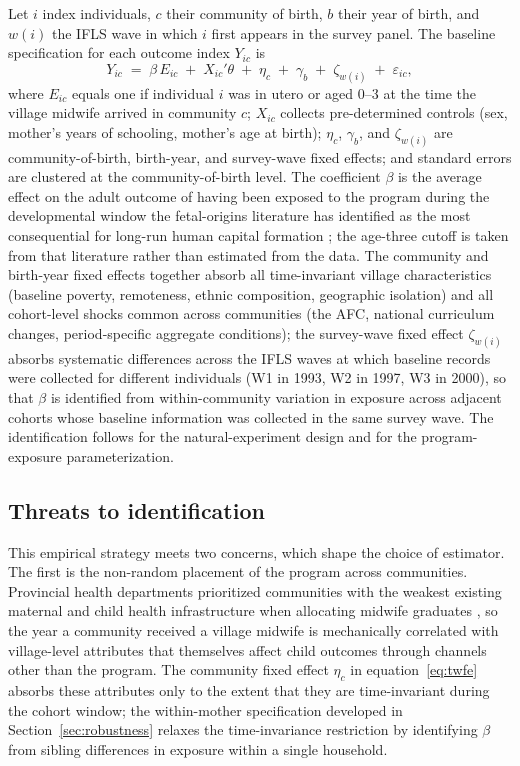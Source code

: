 Let $i$ index individuals, $c$ their community of birth, $b$ their year of birth, and $w(i)$ the IFLS wave in which $i$ first appears in the survey panel. The baseline specification for each outcome index $Y_{ic}$ is \begin{equation} Y_{ic} \;=\; \beta\, E_{ic} \;+\; X_{ic}'\theta \;+\; \eta_c \;+\; \gamma_b \;+\; \zeta_{w(i)} \;+\; \varepsilon_{ic}, \label{eq:twfe} \end{equation} where $E_{ic}$ equals one if individual $i$ was in utero or aged 0--3 at the time the village midwife arrived in community $c$; $X_{ic}$ collects pre-determined controls (sex, mother's years of schooling, mother's age at birth); $\eta_c$, $\gamma_b$, and $\zeta_{w(i)}$ are community-of-birth, birth-year, and survey-wave fixed effects; and standard errors are clustered at the community-of-birth level. The coefficient $\beta$ is the average effect on the adult outcome of having been exposed to the program during the developmental window the fetal-origins literature has identified as the most consequential for long-run human capital formation \autocite{barker1995}; the age-three cutoff is taken from that literature rather than estimated from the data. The community and birth-year fixed effects together absorb all time-invariant village characteristics (baseline poverty, remoteness, ethnic composition, geographic isolation) and all cohort-level shocks common across communities (the AFC, national curriculum changes, period-specific aggregate conditions); the survey-wave fixed effect $\zeta_{w(i)}$ absorbs systematic differences across the IFLS waves at which baseline records were collected for different individuals (W1 in 1993, W2 in 1997, W3 in 2000), so that $\beta$ is identified from within-community variation in exposure across adjacent cohorts whose baseline information was collected in the same survey wave. The identification follows \textcite{duflo2001} for the natural-experiment design and \textcite{ahsan2021} for the program-exposure parameterization.

\subsection{Threats to identification}

This empirical strategy meets two concerns, which shape the choice of estimator. The first is the non-random placement of the program across communities. Provincial health departments prioritized communities with the weakest existing maternal and child health infrastructure when allocating midwife graduates \autocite{frankenberg2005,gani1996,makowiecka2008}, so the year a community received a village midwife is mechanically correlated with village-level attributes that themselves affect child outcomes through channels other than the program. The community fixed effect $\eta_c$ in equation~\eqref{eq:twfe} absorbs these attributes only to the extent that they are time-invariant during the cohort window; the within-mother specification developed in Section~\ref{sec:robustness} relaxes the time-invariance restriction by identifying $\beta$ from sibling differences in exposure within a single household.

